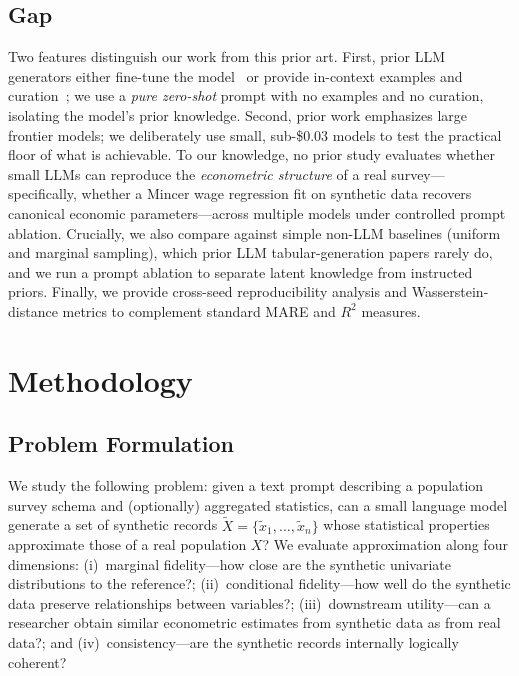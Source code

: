 \documentclass[11pt]{article}
\begin{document}
\subsection{Gap}

Two features distinguish our work from this prior art.
First, prior LLM generators either fine-tune the model~\cite{borisov2023great} or provide in-context examples and curation~\cite{seedat2024curatedllm}; we use a \emph{pure zero-shot} prompt with no examples and no curation, isolating the model's prior knowledge.
Second, prior work emphasizes large frontier models; we deliberately use small, sub-\$0.03 models to test the practical floor of what is achievable.
To our knowledge, no prior study evaluates whether small LLMs can reproduce the \emph{econometric structure} of a real survey---specifically, whether a Mincer wage regression fit on synthetic data recovers canonical economic parameters---across multiple models under controlled prompt ablation.
Crucially, we also compare against simple non-LLM baselines (uniform and marginal sampling), which prior LLM tabular-generation papers rarely do, and we run a prompt ablation to separate latent knowledge from instructed priors.
Finally, we provide cross-seed reproducibility analysis and Wasserstein-distance metrics to complement standard MARE and $R^2$ measures.

\section{Methodology}
\label{sec:method}

\subsection{Problem Formulation}

We study the following problem: given a text prompt describing a population survey schema and (optionally) aggregated statistics, can a small language model generate a set of synthetic records $\tilde{X} = \{\tilde{x}_1, \ldots, \tilde{x}_n\}$ whose statistical properties approximate those of a real population $X$?
We evaluate approximation along four dimensions: (i)~marginal fidelity---how close are the synthetic univariate distributions to the reference?; (ii)~conditional fidelity---how well do the synthetic data preserve relationships between variables?; (iii)~downstream utility---can a researcher obtain similar econometric estimates from synthetic data as from real data?; and (iv)~consistency---are the synthetic records internally logically coherent?
\end{document}

